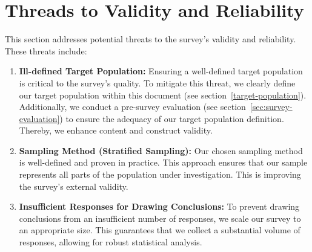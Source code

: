 \documentclass[%
class=scrreprt,
chapterprefix=false,%
open=right,%
twoside=false,%
paper=a4,%
logofile={Logo\_zentral\_farbig\_EN.png},%
thesistype=masterproposal,%
UKenglish,%
]{se2thesis}
\begin{document}
\section{Threads to Validity and Reliability} %
This section addresses potential threats to the survey's validity and reliability. These threats include:
\begin{enumerate}
	\item \textbf{Ill-defined Target Population:} Ensuring a well-defined target population is critical to the survey's quality. To mitigate this threat, we clearly define our target population within this document (see section~\ref{target-population}). Additionally, we conduct a pre-survey evaluation (see section~\ref{sec:survey-evaluation}) to ensure the adequacy of our target population definition. Thereby, we enhance content and construct validity.
	
	\item \textbf{Sampling Method (Stratified Sampling):} Our chosen sampling method is well-defined and proven in practice. This approach ensures that our sample represents all parts of the population under investigation. This is improving the survey's external validity.
	
	\item \textbf{Insufficient Responses for Drawing Conclusions:} To prevent drawing conclusions from an insufficient number of responses, we scale our survey to an appropriate size. This guarantees that we collect a substantial volume of responses, allowing for robust statistical analysis.
\end{enumerate}
\end{document}
